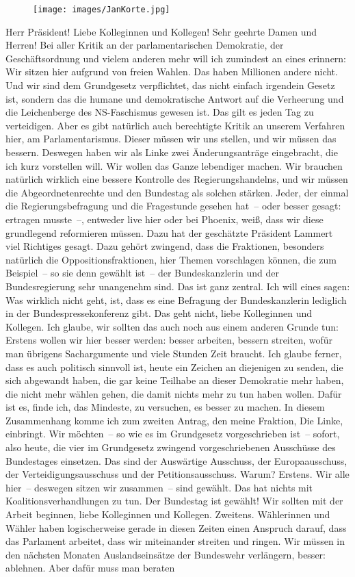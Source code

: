 \documentclass[10pt, a4paper]{report}
\begin{document}
\begin{figure}[!ht]
\texttt{[image: images/JanKorte.jpg]}
\end{figure}


Herr Präsident! Liebe Kolleginnen und Kollegen! Sehr geehrte Damen und Herren! Bei aller Kritik an der parlamentarischen Demokratie, der Geschäftsordnung und vielem anderen mehr will ich zumindest an eines erinnern: Wir sitzen hier aufgrund von freien Wahlen. Das haben Millionen andere nicht. Und wir sind dem Grundgesetz verpflichtet, das nicht einfach irgendein Gesetz ist, sondern das die humane und demokratische Antwort auf die Verheerung und die Leichenberge des NS-Faschismus gewesen ist. Das gilt es jeden Tag zu verteidigen. Aber es gibt natürlich auch berechtigte Kritik an unserem Verfahren hier, am Parlamentarismus. Dieser müssen wir uns stellen, und wir müssen das bessern. Deswegen haben wir als Linke zwei Änderungsanträge eingebracht, die ich kurz vorstellen will. Wir wollen das Ganze lebendiger machen. Wir brauchen natürlich wirklich eine bessere Kontrolle des Regierungshandelns, und wir müssen die Abgeordnetenrechte und den Bundestag als solchen stärken. Jeder, der einmal die Regierungsbefragung und die Fragestunde gesehen hat – oder besser gesagt: ertragen musste –, entweder live hier oder bei Phoenix, weiß, dass wir diese grundlegend reformieren müssen. Dazu hat der geschätzte Präsident Lammert viel Richtiges gesagt. Dazu gehört zwingend, dass die Fraktionen, besonders natürlich die Oppositionsfraktionen, hier Themen vorschlagen können, die zum Beispiel – so sie denn gewählt ist – der Bundeskanzlerin und der Bundesregierung sehr unangenehm sind. Das ist ganz zentral. Ich will eines sagen: Was wirklich nicht geht, ist, dass es eine Befragung der Bundeskanzlerin lediglich in der Bundespressekonferenz gibt. Das geht nicht, liebe Kolleginnen und Kollegen. Ich glaube, wir sollten das auch noch aus einem anderen Grunde tun: Erstens wollen wir hier besser werden: besser arbeiten, bessern streiten, wofür man übrigens Sachargumente und viele Stunden Zeit braucht. Ich glaube ferner, dass es auch politisch sinnvoll ist, heute ein Zeichen an diejenigen zu senden, die sich abgewandt haben, die gar keine Teilhabe an dieser Demokratie mehr haben, die nicht mehr wählen gehen, die damit nichts mehr zu tun haben wollen. Dafür ist es, finde ich, das Mindeste, zu versuchen, es besser zu machen. In diesem Zusammenhang komme ich zum zweiten Antrag, den meine Fraktion, Die Linke, einbringt. Wir möchten – so wie es im Grundgesetz vorgeschrieben ist – sofort, also heute, die vier im Grundgesetz zwingend vorgeschriebenen Ausschüsse des Bundestages einsetzen. Das sind der Auswärtige Ausschuss, der Europaausschuss, der Verteidigungsausschuss und der Petitionsausschuss. Warum? Erstens. Wir alle hier – deswegen sitzen wir zusammen – sind gewählt. Das hat nichts mit Koalitionsverhandlungen zu tun. Der Bundestag ist gewählt! Wir sollten mit der Arbeit beginnen, liebe Kolleginnen und Kollegen. Zweitens. Wählerinnen und Wähler haben logischerweise gerade in diesen Zeiten einen Anspruch darauf, dass das Parlament arbeitet, dass wir miteinander streiten und ringen. Wir müssen in den nächsten Monaten Auslandseinsätze der Bundeswehr verlängern, besser: ablehnen. Aber dafür muss man beraten 
\end{document}
